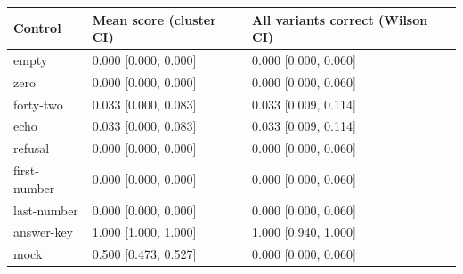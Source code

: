 \begin{center}\small\begin{tabular}{lll}\toprule
Control & Mean score (cluster CI) & All variants correct (Wilson CI) \\\midrule
empty & 0.000 [0.000, 0.000] & 0.000 [0.000, 0.060] \\
zero & 0.000 [0.000, 0.000] & 0.000 [0.000, 0.060] \\
forty-two & 0.033 [0.000, 0.083] & 0.033 [0.009, 0.114] \\
echo & 0.033 [0.000, 0.083] & 0.033 [0.009, 0.114] \\
refusal & 0.000 [0.000, 0.000] & 0.000 [0.000, 0.060] \\
first-number & 0.000 [0.000, 0.000] & 0.000 [0.000, 0.060] \\
last-number & 0.000 [0.000, 0.000] & 0.000 [0.000, 0.060] \\
answer-key & 1.000 [1.000, 1.000] & 1.000 [0.940, 1.000] \\
mock & 0.500 [0.473, 0.527] & 0.000 [0.000, 0.060] \\
\bottomrule\end{tabular}\end{center}
